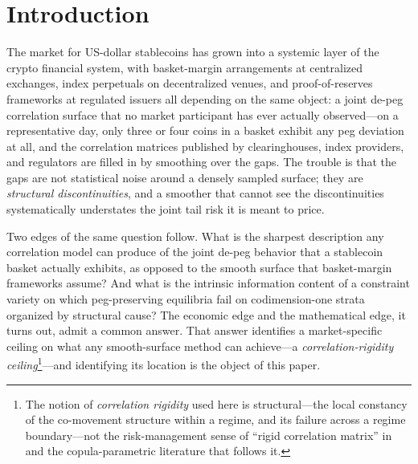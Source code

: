 
\section{Introduction}\label{sec:intro}
The market for US-dollar stablecoins has grown into a systemic layer of the crypto financial system, with basket-margin arrangements at centralized exchanges, index perpetuals on decentralized venues, and proof-of-reserves frameworks at regulated issuers all depending on the same object: a joint de-peg correlation surface that no market participant has ever actually observed---on a representative day, only three or four coins in a basket exhibit any peg deviation at all, and the correlation matrices published by clearinghouses, index providers, and regulators are filled in by smoothing over the gaps. The trouble is that the gaps are not statistical noise around a densely sampled surface; they are \emph{structural discontinuities}, and a smoother that cannot see the discontinuities systematically understates the joint tail risk it is meant to price.

Two edges of the same question follow. What is the sharpest description any correlation model can produce of the joint de-peg behavior that a stablecoin basket actually exhibits, as opposed to the smooth surface that basket-margin frameworks assume? And what is the intrinsic information content of a constraint variety on which peg-preserving equilibria fail on codimension-one strata organized by structural cause? The economic edge and the mathematical edge, it turns out, admit a common answer. That answer identifies a market-specific ceiling on what any smooth-surface method can achieve---a \emph{correlation-rigidity ceiling}\footnote{The notion of \emph{correlation rigidity} used here is structural---the local constancy of the co-movement structure within a regime, and its failure across a regime boundary---not the risk-management sense of ``rigid correlation matrix'' in \citet{Li2000} and the copula-parametric literature that follows it.}---and identifying its location is the object of this paper.

